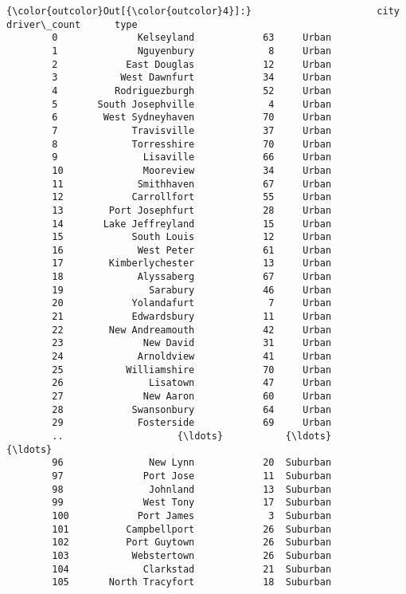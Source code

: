 \documentclass[11pt]{article}
\begin{document}
\begin{Verbatim}[commandchars=\\\{\}]
{\color{outcolor}Out[{\color{outcolor}4}]:}                      city  driver\_count      type
        0              Kelseyland            63     Urban
        1              Nguyenbury             8     Urban
        2            East Douglas            12     Urban
        3           West Dawnfurt            34     Urban
        4          Rodriguezburgh            52     Urban
        5       South Josephville             4     Urban
        6        West Sydneyhaven            70     Urban
        7             Travisville            37     Urban
        8             Torresshire            70     Urban
        9               Lisaville            66     Urban
        10              Mooreview            34     Urban
        11             Smithhaven            67     Urban
        12            Carrollfort            55     Urban
        13        Port Josephfurt            28     Urban
        14       Lake Jeffreyland            15     Urban
        15            South Louis            12     Urban
        16             West Peter            61     Urban
        17        Kimberlychester            13     Urban
        18             Alyssaberg            67     Urban
        19               Sarabury            46     Urban
        20            Yolandafurt             7     Urban
        21            Edwardsbury            11     Urban
        22        New Andreamouth            42     Urban
        23              New David            31     Urban
        24             Arnoldview            41     Urban
        25           Williamshire            70     Urban
        26               Lisatown            47     Urban
        27              New Aaron            60     Urban
        28            Swansonbury            64     Urban
        29             Fosterside            69     Urban
        ..                    {\ldots}           {\ldots}       {\ldots}
        96               New Lynn            20  Suburban
        97              Port Jose            11  Suburban
        98               Johnland            13  Suburban
        99              West Tony            17  Suburban
        100            Port James             3  Suburban
        101          Campbellport            26  Suburban
        102          Port Guytown            26  Suburban
        103           Webstertown            26  Suburban
        104             Clarkstad            21  Suburban
        105       North Tracyfort            18  Suburban

\end{Verbatim}
\end{document}
